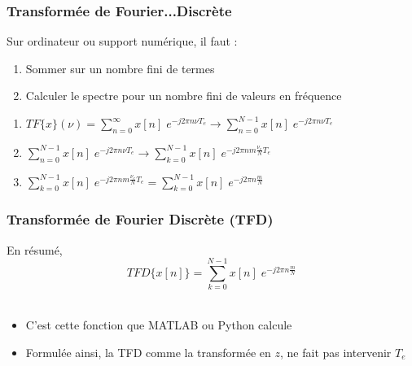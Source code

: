 \documentclass{beamer}
\begin{document}
\begin{frame}
\frametitle{Transformée de Fourier...Discrète}
Sur ordinateur ou support numérique, il faut :\\ 
\vspace{0.3cm}
\begin{enumerate}
\item<2-> Sommer sur un nombre fini de termes
\vspace{0.3cm}
\item<3-> Calculer le spectre pour un nombre fini de valeurs en fréquence 
\end{enumerate}

\vspace{0.3cm}
\vspace{0.3cm}
\begin{enumerate}
\item<5-> $TF\{ x \}(\nu) = \sum_{n = 0}^{\infty} x[n] \; e^{-j 2 \pi n \nu T_e} \rightarrow  \sum_{n = 0}^{N-1} x[n] \; e^{-j 2 \pi n \nu T_e}$\vspace{0.5cm}
\item<6->$\sum_{n = 0}^{N-1} x[n] \; e^{-j 2 \pi n \nu T_e} \rightarrow  \sum_{k = 0}^{N-1} x[n] \; e^{-j 2 \pi n m \frac{\nu_e}{N} T_e }  $
\vspace{0.5cm}
\item<7-> $\sum_{k = 0}^{N-1} x[n] \; e^{-j 2 \pi n m \frac{\nu_e}{N} T_e } = \sum_{k = 0}^{N-1} x[n] \; e^{-j 2 \pi n \frac{m}{N} }$
\end{enumerate} 

\end{frame}

\begin{frame}
\frametitle{Transformée de Fourier Discrète (TFD)}
En résumé,\\
\vspace{0.3cm} 
\[ TFD\{ x[n] \} =  \sum_{k = 0}^{N-1} x[n] \; e^{-j 2 \pi n \frac{m}{N}}  \] \\
\vspace{0.4cm}

\vspace{0.3cm}
\begin{itemize}
\item<2-> C'est cette fonction que MATLAB ou Python calcule
\vspace{0.3cm}
\item<3-> Formulée ainsi, la TFD comme la transformée en $z$, ne fait pas intervenir $T_e$  
\end{itemize}

\end{frame}
\end{document}
